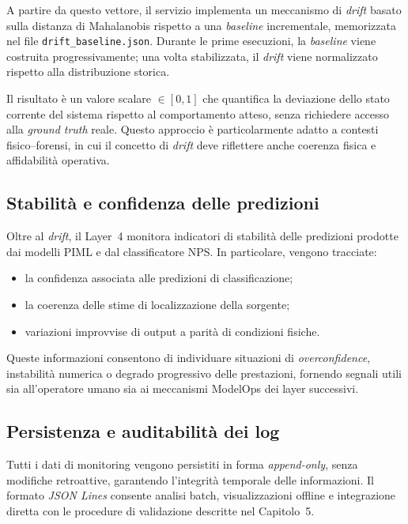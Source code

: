 A partire da questo vettore, il servizio implementa un meccanismo di \textit{drift} basato sulla distanza di Mahalanobis rispetto a una \textit{baseline} incrementale, memorizzata nel file \texttt{drift\_baseline.json}.
Durante le prime esecuzioni, la \textit{baseline} viene costruita progressivamente; una volta stabilizzata, il \textit{drift} viene normalizzato rispetto alla distribuzione storica.

Il risultato è un valore scalare $\in [0,1]$ che quantifica la deviazione dello stato corrente del sistema rispetto al comportamento atteso, senza richiedere accesso alla \textit{ground truth} reale.
Questo approccio è particolarmente adatto a contesti fisico--forensi, in cui il concetto di \textit{drift} deve riflettere anche coerenza fisica e affidabilità operativa.

\subsection{Stabilità e confidenza delle predizioni}

Oltre al \textit{drift}, il Layer~4 monitora indicatori di stabilità delle predizioni prodotte dai modelli PIML e dal classificatore NPS.
In particolare, vengono tracciate:
\begin{itemize}
	\item la confidenza associata alle predizioni di classificazione;
	\item la coerenza delle stime di localizzazione della sorgente;
	\item variazioni improvvise di output a parità di condizioni fisiche.
\end{itemize}

Queste informazioni consentono di individuare situazioni di \textit{overconfidence}, instabilità numerica o degrado progressivo delle prestazioni, fornendo segnali utili sia all’operatore umano sia ai meccanismi ModelOps dei layer successivi.

\subsection{Persistenza e auditabilità dei log}

Tutti i dati di monitoring vengono persistiti in forma \textit{append-only}, senza modifiche retroattive, garantendo l’integrità temporale delle informazioni.
Il formato \textit{JSON Lines} consente analisi batch, visualizzazioni offline e integrazione diretta con le procedure di validazione descritte nel Capitolo~5.

